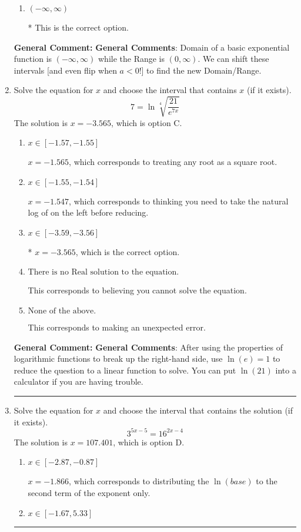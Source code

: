 \documentclass{extbook}[14pt]
\newcommand{\litem}[1]{\item #1

\rule{\textwidth}{0.4pt}}
\begin{document}
\begin{enumerate}
{\begin{enumerate}[label=\Alph*.]
$(3, \infty)$, which corresponds to using the negative vertical shift AND flipping the Range interval.
\item \( (-\infty, \infty) \)

* This is the correct option.
\end{enumerate}

\textbf{General Comment:} \textbf{General Comments}: Domain of a basic exponential function is $(-\infty, \infty)$ while the Range is $(0, \infty)$. We can shift these intervals [and even flip when $a<0$!] to find the new Domain/Range.
}
\litem{
 Solve the equation for $x$ and choose the interval that contains $x$ (if it exists).
\[  7 = \ln{\sqrt[4]{\frac{21}{e^{7x}}}} \]The solution is \( x = -3.565 \), which is option C.\begin{enumerate}[label=\Alph*.]
\item \( x \in [-1.57, -1.55] \)

$x = -1.565$, which corresponds to treating any root as a square root.
\item \( x \in [-1.55, -1.54] \)

$x = -1.547$, which corresponds to thinking you need to take the natural log of on the left before reducing.
\item \( x \in [-3.59, -3.56] \)

* $x = -3.565$, which is the correct option.
\item \( \text{There is no Real solution to the equation.} \)

This corresponds to believing you cannot solve the equation.
\item \( \text{None of the above.} \)

This corresponds to making an unexpected error.
\end{enumerate}

\textbf{General Comment:} \textbf{General Comments}: After using the properties of logarithmic functions to break up the right-hand side, use $\ln(e) = 1$ to reduce the question to a linear function to solve. You can put $\ln(21)$ into a calculator if you are having trouble.
}
\litem{
Solve the equation for $x$ and choose the interval that contains the solution (if it exists).
\[ 3^{5x-5} = 16^{2x-4} \]The solution is \( x = 107.401 \), which is option D.\begin{enumerate}[label=\Alph*.]
\item \( x \in [-2.87, -0.87] \)

$x = -1.866$, which corresponds to distributing the $\ln(base)$ to the second term of the exponent only.
\item \( x \in [-1.67, 5.33] \)


\end{enumerate}}
\end{enumerate}
\end{document}
